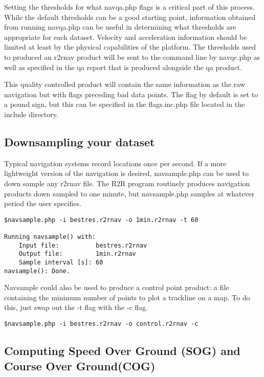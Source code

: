 \documentclass{article}
\begin{document}
Setting the thresholds for what navqa.php flags is a critical part of this process.  While the default thresholds can be a good starting point, information obtained from running navqa.php can be useful in determining what thresholds are appropriate for each dataset.  Velocity and acceleration information should be limited at least by the physical capabilities of the platform.  The thresholds used to produced an r2rnav product will be sent to the command line by navqc.php as well as specified in the qa report that is produced alongside the qa product.

This quality controlled product will contain the same information as the raw navigation but with flags preceding bad data points.  The flag by default is set to a pound sign, but this can be specified in the flags.inc.php file located in the include directory.

		\subsection{Downsampling your dataset}
		\label{navsample}
		
Typical navigation systems record locations once per second.  If a more lightweight version of the navigation is desired, navsample.php can be used to down sample any r2rnav file.  The R2R program routinely produces navigation products down sampled to one minute, but navsample.php samples at whatever period the user specifies.

		\begin{lstlisting}
$navsample.php -i bestres.r2rnav -o 1min.r2rnav -t 60
		
Running navsample() with:
	Input file:          bestres.r2rnav
	Output file:         1min.r2rnav
	Sample interval [s]: 60
navsample(): Done.
		\end{lstlisting}
		
Navsample could also be used to produce a control point product: a file containing the minimum number of points to plot a trackline on a map.  To do this, just swap out the -t flag with the -c flag.

\begin{lstlisting}
$navsample.php -i bestres.r2rnav -o control.r2rnav -c
\end{lstlisting}

		\subsection{Computing Speed Over Ground (SOG) and Course Over Ground(COG)}
		\label{sogcog}
		
\end{document}
